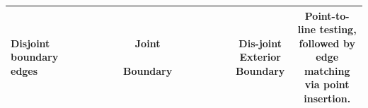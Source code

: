\begin{table}
\begin{tabularx}{\textwidth}{|m{1.5cm}|C|C|C|}
\centering Disjoint boundary edges &  Joint ~~~~~~~~~~~~~~~~~~~~~~~~~~ Boundary&  Dis-joint Exterior Boundary& Point-to-line testing, followed by edge matching via point insertion. \\ \hline

\end{tabularx}
\end{table}
